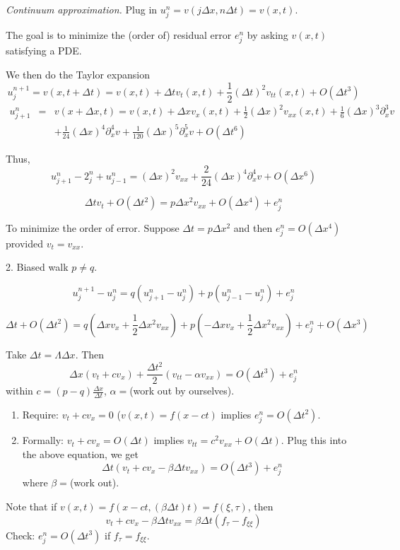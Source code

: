 \documentclass[11pt]{amsart}%
\begin{document}
\emph{Continuum approximation.} Plug in $u^n_j = v(j\Delta x, n \Delta t)= v(x,t)$.

The goal is to minimize the (order of) residual error $e_j^n$ by asking $v(x,t)$ satisfying a PDE.

We then do the Taylor expansion
$$u_j^{n+1} = v(x,t+\Delta t) = v(x,t)+\Delta tv_t(x,t) + \frac{1}{2} (\Delta t)^2 v_{tt}(x,t) + O(\Delta t^3)$$
\begin{eqnarray*}
u_{j+1}^{n} &=& v(x+\Delta x,t) = v(x,t)+\Delta xv_x(x,t) + \frac{1}{2} (\Delta x)^2 v_{xx}(x,t) + \frac{1}{6}(\Delta x)^3 \partial^3_x v\\ &&+\frac{1}{24} (\Delta x)^4\partial_x^4 v +\frac{1}{120} (\Delta x)^5\partial_x^5v + O(\Delta t^6)
\end{eqnarray*}

Thus,
$$u_{j+1}^n-2_j^n + u_{j-1}^n = (\Delta x)^2 v_{xx} + \frac{2}{24}(\Delta x)^4 \partial^4_x v + O(\Delta x ^6)$$

$$\Delta t v_t + O(\Delta t^2) = p\Delta x^2 v_{xx} + O(\Delta x^4) + e^n_j$$

To minimize the order of error. Suppose $\Delta t = p\Delta x^2$ and then $e^n_j=O(\Delta x^4)$ provided $v_t=v_{xx}$.

2. Biased walk $p\not=q$.

$$u_j^{n+1} - u^n_j = q(u^n_{j+1} - u^n_j) + p(u^n_{j-1} - u^n_j) + e^n_j$$

$$\Delta t + O(\Delta t^2) = q(\Delta x v_x + \frac{1}{2} \Delta x^2 v_{xx}) + p(-\Delta x v_x +\frac{1}{2}\Delta x^2 v_{xx}) + e_j^n+O(\Delta x^3)$$

Take $\Delta t =\Lambda \Delta x$. Then
$$\Delta x(v_t+cv_x) + \frac{\Delta t^2}{2} (v_{tt} -\alpha v_{xx})= O(\Delta t^3) + e^n_j$$ within $c=(p-q)\frac{\Delta x}{\Delta t}$, $\alpha=$(work out by ourselves).

\begin{enumerate}
    \item Require: $v_t+ cv_x=0$ ($v(x,t) = f(x-ct)$ implies $e^n_j = O(\Delta t^2)$.
    \item Formally: $v_t+cv_x=O(\Delta t)$ implies $v_{tt}=c^2 v_{xx} +O(\Delta t)$. Plug this into the above equation, we get
    $$\Delta t(v_t +cv_x -\beta \Delta t v_{xx})=O(\Delta t^3) + e^n_j$$ where $\beta =$(work out).
\end{enumerate}

Note that if $v(x,t) = f(x-ct,(\beta \Delta t)t) = f(\xi, \tau)$, then
$$v_t + cv_x -\beta \Delta t v_{xx} = \beta \Delta t(f_{\tau}-f_{\xi\xi})$$
Check: $e^n_j = O(\Delta t^3)$ if $f_\tau = f_{\xi\xi}$.
\end{document}
